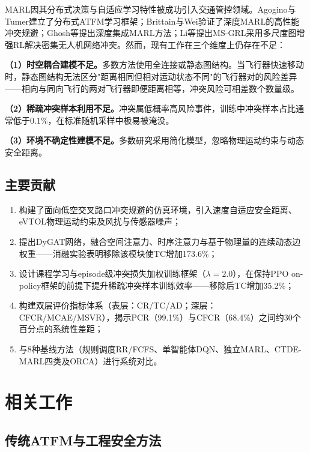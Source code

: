 \documentclass[12pt,a4paper,UTF8]{ctexart}
\begin{document}
MARL因其分布式决策与自适应学习特性被成功引入交通管控领域。Agogino与Tumer\cite{ref6,ref7}建立了分布式ATFM学习框架；Brittain与Wei\cite{ref8}验证了深度MARL的高性能冲突规避；Ghosh等\cite{ref9}提出深度集成MARL方法；Li等\cite{ref10}提出MS-GRL采用多尺度图增强RL解决密集无人机网络冲突。然而，现有工作在三个维度上仍存在不足：

\textbf{（1）时空耦合建模不足。}多数方法使用全连接或静态图结构\cite{ref8,ref10,ref11}。当飞行器快速移动时，静态图结构无法区分"距离相同但相对运动状态不同"的飞行器对的风险差异——相向与同向飞行的两对飞行器即便距离相等，冲突风险可相差数个数量级。

\textbf{（2）稀疏冲突样本利用不足。}冲突属低概率高风险事件，训练中冲突样本占比通常低于$0.1\%$\cite{ref12,ref13}，在标准随机采样中极易被淹没。

\textbf{（3）环境不确定性建模不足。}多数研究采用简化模型，忽略物理运动约束与动态安全距离\cite{ref11}。

\subsection{主要贡献}

\begin{enumerate}[label=(\arabic*)]
    \item 构建了面向低空交叉路口冲突规避的仿真环境，引入速度自适应安全距离、eVTOL物理运动约束及风扰与传感器噪声；
    \item 提出DyGAT网络，融合空间注意力、时序注意力与基于物理量的连续动态边权重——消融实验表明移除该模块使TC增加173.6\%；
    \item 设计课程学习与episode级冲突损失加权训练框架（$\lambda=2.0$），在保持PPO on-policy框架的前提下提升稀疏冲突样本训练效率——移除后TC增加35.2\%；
    \item 构建双层评价指标体系（表层：CR/TC/AD；深层：CFCR/MCAE/MSVR），揭示PCR（99.1\%）与CFCR（68.4\%）之间约30个百分点的系统性差距；
    \item 与8种基线方法（规则调度RR/FCFS、单智能体DQN、独立MARL、CTDE-MARL四类及ORCA）进行系统对比。
\end{enumerate}

\section{相关工作}

\subsection{传统ATFM与工程安全方法}
\end{document}
